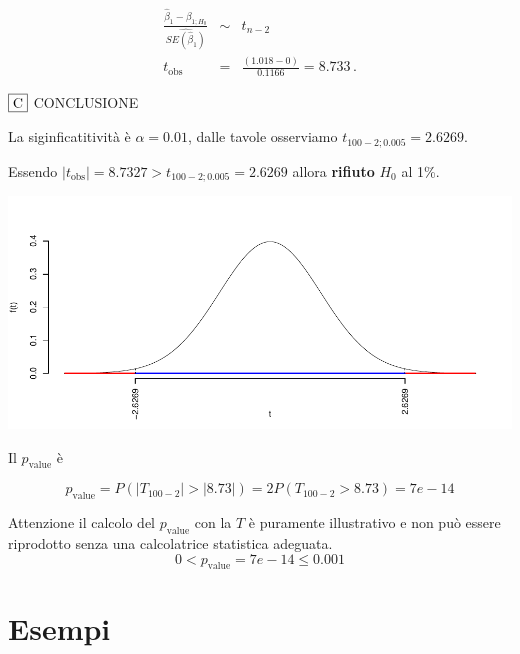\documentclass[
  11pt,
]{book}
\theoremstyle{mytheoremstyle}
\theoremstyle{mydefstyle}
\begin{document}
\begin{eqnarray*}
 \frac{\hat\beta_{ 1 } - \beta_{ 1 ;H_0}} {\widehat{SE(\hat\beta_{ 1 })}}&\sim&t_{n-2}\\
   t_{\text{obs}}
&=& \frac{ ( 1.018 -  0 )} { 0.1166 }
 =   8.733 \, .
\end{eqnarray*}

\(\fbox{C}\) CONCLUSIONE

La siginficatitività è \(\alpha=0.01\), dalle tavole osserviamo \(t_{100-2;0.005}=2.6269\).

Essendo \(|t_\text{obs}|=8.7327>t_{100-2;0.005}=2.6269\) allora \textbf{rifiuto} \(H_0\) al 1\%.

\begin{center}\includegraphics{Appunti_di_Statistica_2025_files/figure-latex/25-test-functions-11-2} \end{center}

Il \(p_{\text{value}}\) è

\[ p_{\text{value}} = P(|T_{100-2}|>|8.73|)=2P(T_{100-2}>8.73)=7e-14 \]

Attenzione il calcolo del \(p_\text{value}\) con la \(T\) è puramente illustrativo e non può essere riprodotto senza una calcolatrice statistica adeguata.\[
 0 < p_\text{value}= 7e-14 \leq 0.001 
\]

\section{Esempi}\label{esempi-3}
\end{document}
